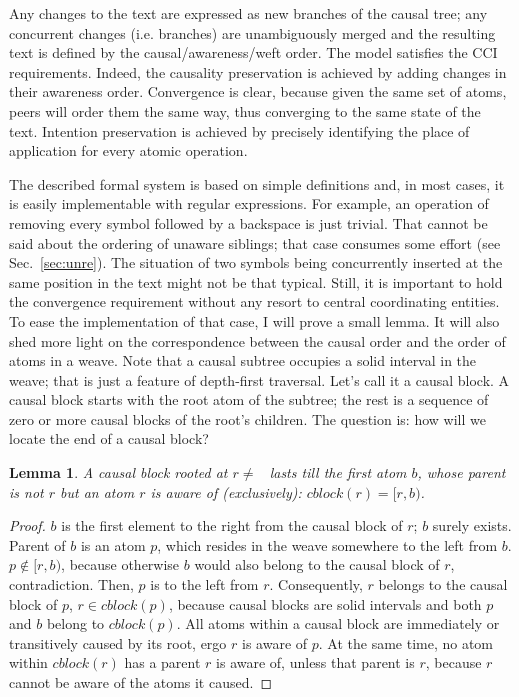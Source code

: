 \documentclass{sig-alternate}
\newtheorem{lemma}{Lemma}
\newcommand{\tighten}{\setlength{\itemsep}{1pt}\setlength{\parskip}{0pt}\setlength{\parsep}{0pt}}
\begin{document}
Any changes to the text are expressed as new branches  of the causal tree; any concurrent changes (i.e. branches) are unambiguously merged and the resulting text is defined by the causal/awareness/weft order.
The model satisfies the CCI requirements.
Indeed, the causality preservation is achieved by adding changes in their awareness order.
Convergence is clear, because given the same set of atoms, peers will order them the same way, thus converging to the same state of the text.
Intention preservation is achieved by precisely identifying the place of application for every atomic operation.

The described formal system is based on simple definitions and, in most cases, it is easily implementable with regular expressions.
For example, an operation of removing every symbol followed by a backspace is just trivial.
That cannot be said about the ordering of unaware siblings; that case consumes some effort (see Sec.~\ref{sec:unre}).
The situation of two symbols being concurrently inserted at the same position in the text might not be that typical.
Still, it is important to hold the convergence requirement without any resort to central coordinating entities. 
To ease the implementation of that case, I will prove
a small lemma. It will also shed more light on the
correspondence between the causal order and the order of atoms
in a weave.
Note that a causal subtree occupies a solid interval in the weave; that is just a feature of depth-first traversal.
Let's call it a causal block.
A causal block starts with the root atom of the subtree; the rest is a sequence of zero or more causal blocks of the root's children.
The question is: how will we locate the end of a causal block?
\begin{lemma}\tighten A causal block rooted at $r \ne$ \aum ~lasts till
the first atom $b$, whose parent is not $r$ but an atom
$r$ is aware of (exclusively):  $cblock(r) = [r,b)$. \label{lemma:1}
\end{lemma} 
\begin{proof}\tighten
$b$ is the first element to the right from the causal
block of $r$; $b$ surely exists. Parent of $b$ is an atom $p$,
which resides in the weave somewhere to the left from $b$.
$p \notin [r,b)$, because otherwise $b$ would also belong
to the causal block of $r$, contradiction.
Then, $p$ is to the left from $r$. Consequently, $r$ belongs
to the causal block of $p$, $r \in cblock(p)$, because
causal blocks are solid intervals and both $p$ and $b$
belong to $cblock(p)$. All atoms within a causal block are
immediately or transitively caused by its root,
ergo $r$ is aware of $p$. At the same time, no atom
within $cblock(r)$ has a parent $r$ is aware of, unless
that parent is $r$, because $r$ cannot be aware of the
atoms it caused.
\end{proof}
\end{document}
